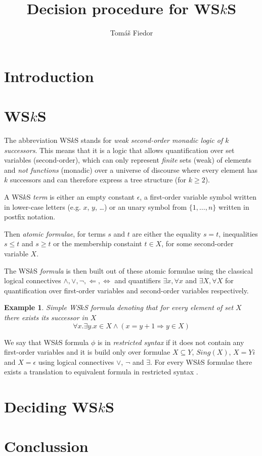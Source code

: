 \documentclass{eeict}
\title{Decision procedure for WS$k$S}
\author{Tomáš Fiedor}
\newtheorem{example}{Example}[section]
\begin{document}
\maketitle

\section{Introduction}

\section{WS$k$S}

The abbreviation WS$k$S stands for \emph{weak second-order monadic logic of $k$
successors}. This means that it is a logic that allows quantification over set
variables (second-order), which can only represent \emph{finite} sets (weak) of
elements and \emph{not functions} (monadic) over a universe of discourse where
every element has $k$ successors and can therefore express a tree structure
(for $k \geq 2$).

A WS$k$S \emph{term} is either an empty constant $\epsilon$, a first-order
variable symbol written in lower-case letters (e.g. $x$, $y$, \ldots) or an
unary symbol from $\{1,\ldots,n\}$ written in postfix notation. 

Then \emph{atomic formulae}, for terms $s$ and $t$ are either the equality $s =
t$, inequalities $s \leq t$ and $s \geq t$ or the membership constaint $t \in
X$, for some second-order variable $X$.

The WS$k$S \emph{formula} is then built out of these atomic formulae using the
classical logical connectives $\wedge, \vee, \neg, \Leftarrow, \Leftrightarrow$
and quantifiers $\exists x, \forall x$ and $\exists X, \forall X$ for
quantification over first-order variables and second-order variables
respectively.

\begin{example} Simple WS$k$S formula denoting that for every element of set $X$
there exists its successor in $X$ $$ \forall x. \exists y. x \in X \wedge (x = y
+ 1 \Rightarrow y \in X) $$
\end{example}

We say that WS$k$S formula $\phi$ is in \emph{restricted syntax} if it does not
contain any first-order variables and it is build only over formulae $X
\subseteq Y$, $Sing(X)$, $X = Yi$ and $X = \epsilon$ using logical connectives
$\vee$, $\neg$ and $\exists$. For every WS$k$S formulae there exists a
translation to equivalent formula in restricted syntax \cite{tata}.

\section{Deciding WS$k$S}



\section{Conclussion}

%
\begin{thebibliography}{9}
\end{thebibliography}
\end{document}
